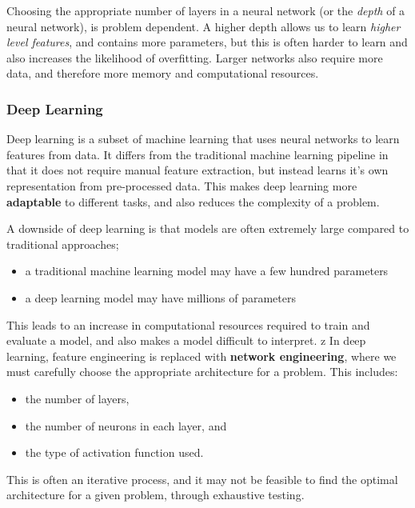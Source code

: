 \documentclass{article}
\begin{document}
Choosing the appropriate number of layers in a neural network (or the
\textit{depth} of a neural network), is problem dependent. A higher
depth allows us to learn \textit{higher level features}, and contains
more parameters, but this is often harder to learn and also increases
the likelihood of overfitting. Larger networks also require more data,
and therefore more memory and computational resources.
\subsubsection{Deep Learning}
Deep learning is a subset of machine learning that uses neural networks
to learn features from data. It differs from the traditional machine
learning pipeline in that it does not require manual feature
extraction, but instead learns it's own representation from
pre-processed data. This makes deep learning more \textbf{adaptable} to
different tasks, and also reduces the complexity of a problem.

A downside of deep learning is that models are often extremely large
compared to traditional approaches;
\begin{itemize}
    \item a traditional machine learning model may have a few hundred
          parameters
    \item a deep learning model may have millions of parameters
\end{itemize}
This leads to an increase in computational resources required to train
and evaluate a model, and also makes a model difficult to interpret.
z
In deep learning, feature engineering is replaced with \textbf{network
    engineering}, where we must carefully choose the appropriate
architecture for a problem. This includes:
\begin{itemize}
    \item the number of layers,
    \item the number of neurons in each layer, and
    \item the type of activation function used.
\end{itemize}
This is often an iterative process, and it may not be feasible to find
the optimal architecture for a given problem, through exhaustive
testing.
\end{document}
